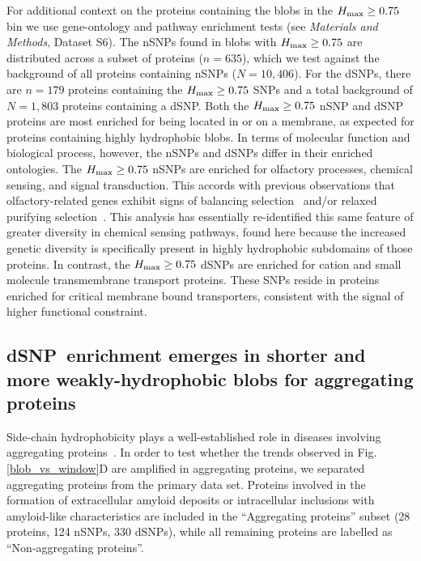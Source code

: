 \documentclass[9pt,twocolumn,twoside,lineno]{pnas-new}
\newcommand{\aucomment}[1]{}
\newcommand{\dSNP}{dSNP~}
\newcommand{\cmax}{H_{\rm max}}
\begin{document}
For additional context on the proteins containing the blobs in the $\cmax\geq 0.75$ bin we use gene-ontology and pathway enrichment tests (see {\em Materials and Methods}, Dataset S6). The nSNPs found in blobs with $\cmax\geq 0.75$ are distributed across a subset of proteins ($n=635$), which we test against the background of all proteins containing nSNPs ($N=10,406$).  For the dSNPs, there are $n=179$ proteins containing the $\cmax\geq 0.75$ SNPs and a total background of $N=1,803$ proteins containing a dSNP. Both the $\cmax \geq 0.75$ nSNP and dSNP proteins are most enriched for being located in or on a membrane, as expected for proteins containing highly hydrophobic blobs. In terms of molecular function and biological process, however, the nSNPs and dSNPs differ in their enriched ontologies. The $\cmax\geq 0.75$ nSNPs are enriched for olfactory processes, chemical sensing, and signal transduction. This accords with previous observations that olfactory-related genes exhibit signs of balancing selection~\cite{Alonso2008} and/or relaxed purifying selection~\cite{Pierron2013}. This analysis has essentially re-identified this same feature of greater diversity in chemical sensing pathways, found here because the increased genetic diversity is specifically present in highly hydrophobic subdomains of those proteins. In contrast, the $\cmax\geq 0.75$ dSNPs are enriched for cation and small molecule transmembrane transport proteins. These SNPs reside in proteins enriched for critical membrane bound transporters, consistent with the signal of higher functional constraint.

\subsection*{\dSNP enrichment emerges in shorter and more weakly-hydrophobic blobs for aggregating proteins}
\aucomment{This section was reorganized to correspond with the order of the panels in Figure 4, and to emphasize the distribution shift in Panel D as a culminating result.}
Side-chain hydrophobicity plays a well-established role in diseases involving aggregating proteins~\citep{ConchilloSole2007, Fang2013, Tartaglia2008}. In order to test whether the trends observed in Fig. \ref{blob_vs_window}D are amplified in aggregating proteins, we separated aggregating proteins from the primary data set. Proteins involved in the formation of extracellular amyloid deposits or intracellular inclusions with amyloid-like characteristics are included in the ``Aggregating proteins''  subset (28 proteins, 124 nSNPs, 330 dSNPs), while all remaining proteins are labelled as ``Non-aggregating proteins''. 
\end{document}
